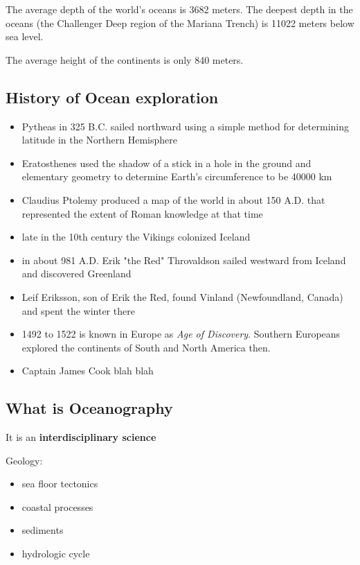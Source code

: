 The average depth of the world's oceans is 3682 meters. The deepest depth in
the oceans (the Challenger Deep region of the Mariana Trench) is 11022 meters
below sea level.

The average height of the continents is only 840 meters.

\subsection{History of Ocean exploration}

\begin{itemize}
	\item Pytheas in 325 B.C. sailed northward using a simple method for
		determining latitude in the Northern Hemisphere
	\item Eratosthenes used the shadow of a stick in a hole in the ground
		and elementary geometry to determine Earth's circumference to
		be 40000 km
	\item Claudius Ptolemy produced a map of the world in about 150 A.D.
		that represented the extent of Roman knowledge at that time
	\item late in the 10th century the Vikings colonized Iceland
	\item in about 981 A.D. Erik "the Red" Throvaldson sailed westward
		from Iceland and discovered Greenland
	\item Leif Eriksson, son of Erik the Red, found Vinland (Newfoundland,
		Canada) and spent the winter there
	\item 1492 to 1522 is known in Europe as \textit{Age of Discovery}.
		Southern Europeans explored the continents of South and
		North America then.
	\item Captain James Cook blah blah
\end{itemize}

\subsection{What is Oceanography}

It is an \textbf{interdisciplinary science}

Geology:
\begin{itemize}
	\item sea floor tectonics
	\item coastal processes
	\item sediments
	\item hydrologic cycle
\end{itemize}

